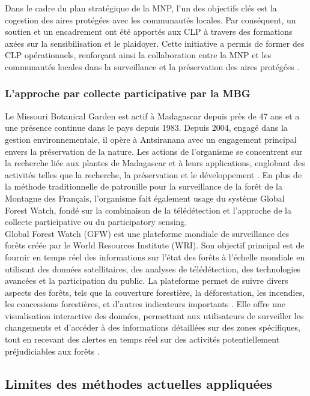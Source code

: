 Dans le cadre du plan stratégique de la MNP, l'un des objectifs clés est la cogestion des aires protégées avec les communautés locales. Par conséquent, un soutien et un encadrement ont été apportés aux CLP à travers des formations axées sur la sensibilisation et le plaidoyer. Cette initiative a permis de former des CLP opérationnels, renforçant ainsi la collaboration entre la MNP et les communautés locales dans la surveillance et la préservation des aires protégées \cite{51}.

\subsubsection{	L’approche par collecte participative par la MBG}
Le Missouri Botanical Garden est actif à Madagascar depuis près de 47 ans et a une présence continue dans le pays depuis 1983. Depuis 2004, engagé dans la gestion environnementale, il opère à Antsiranana avec un engagement principal envers la préservation de la nature. Les actions de l'organisme se concentrent sur la recherche liée aux plantes de Madagascar et à leurs applications, englobant des activités telles que la recherche, la préservation et le développement \cite{52}. En plus de la méthode traditionnelle de patrouille pour la surveillance de la forêt de la Montagne des Français, l'organisme fait également usage du système Global Forest Watch, fondé sur la combinaison de la télédétection et l’approche de la collecte participative ou du participatory sensing.
\\

Global Forest Watch (GFW) est une plateforme mondiale de surveillance des forêts créée par le World Resources Institute (WRI). Son objectif principal est de fournir en temps réel des informations sur l'état des forêts à l'échelle mondiale en utilisant des données satellitaires, des analyses de télédétection, des technologies avancées et la participation du public. La plateforme permet de suivre divers aspects des forêts, tels que la couverture forestière, la déforestation, les incendies, les concessions forestières, et d'autres indicateurs importants \cite{53}. Elle offre une visualisation interactive des données, permettant aux utilisateurs de surveiller les changements et d'accéder à des informations détaillées sur des zones spécifiques, tout en recevant des alertes en temps réel sur des activités potentiellement préjudiciables aux forêts \cite{54}.

\subsection{Limites des méthodes actuelles appliquées}
